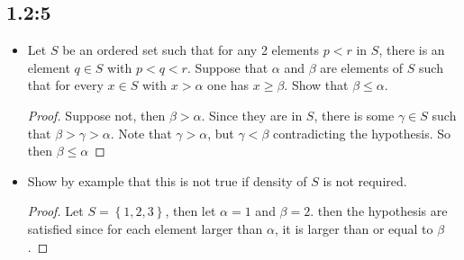 \documentclass[11pt]{article}
\newenvironment{bp}{\color{blue}\begin{proof}}{\end{proof}}
\begin{document}
\subsection*{1.2:5}
\begin{itemize}
  \item Let $S$ be an ordered set such that for any 2 elements $p < r$ in $S$, there is an element $q\in S$ with $p<q<r$. Suppose that $\alpha$ and $\beta$ are elements of $S$ such that for every $x\in S$ with $x > \alpha$ one has $x \geq \beta$. Show that $\beta\leq\alpha$.

 \begin{bp}
  Suppose not, then $\beta > \alpha$. Since they are in $S$, there is some $\gamma\in S$ such that \newline $\beta > \gamma > \alpha$. Note that $\gamma > \alpha$, but $\gamma < \beta$ contradicting the hypothesis. So then $\beta\leq \alpha$
 \end{bp}
  \item Show by example that this is not true if density of $S$ is not required.
\begin{bp}
  Let $S = \left\{ 1,2,3 \right\}$, then let $\alpha = 1$ and $\beta = 2$. then the hypothesis are satisfied since for each element larger than $\alpha$, it is larger than or equal to $\beta$.
\end{bp}
\end{itemize}
\end{document}
